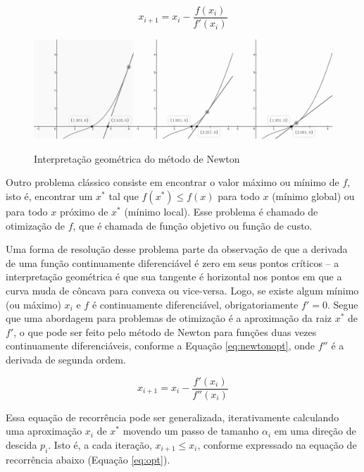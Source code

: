 \documentclass[cic,tc]{iiufrgs}
\begin{document}
\begin{equation}
\label{eq:newton}
x_{i + 1} = x_i - \frac{f(x_i)}{f'(x_i)}
\end{equation}

\begin{figure} \caption{Interpretação geométrica do método de Newton} \begin{center}
\includegraphics[width=0.8\linewidth]{img/tan.png} \end{center}
 \label{fig:tan} \end{figure}

Outro problema clássico consiste em encontrar o valor máximo ou mínimo de $f$,
isto é, encontrar um $x^*$ tal que $f(x^*) \le f(x)$ para todo $x$ (mínimo
global) ou para todo $x$ próximo de $x^*$ (mínimo local). Esse problema é
chamado de otimização de $f$, que é chamada de função objetivo ou função de
custo.

Uma forma de resolução desse problema parte da observação de que a derivada de
uma função continuamente diferenciável é zero em seus pontos críticos -- a
interpretação geométrica é que sua tangente é horizontal nos pontos em que a
curva muda de côncava para convexa ou vice-versa. Logo, se existe algum mínimo
(ou máximo) $x_i$ e $f$ é continuamente diferenciável, obrigatoriamente $f' =
0$. Segue que uma abordagem para problemas de otimização é a aproximação da
raiz $x^*$ de $f'$, o que pode ser feito pelo método de Newton para funções
duas vezes continuamente diferenciáveis, conforme a Equação \ref{eq:newtonopt},
onde $f''$ é a derivada de segunda ordem.

\begin{equation}
\label{eq:newtonopt}
x_{i + 1} = x_i - \frac{f'(x_i)}{f''(x_i)}
\end{equation}

Essa equação de recorrência pode ser generalizada, iterativamente calculando
uma aproximação $x_i$ de $x^*$ movendo um passo de tamanho $\alpha_i$ em uma
direção de descida $p_i$. Isto é, a cada iteração, $x_{i+1} \le x_i$, conforme
expressado na equação de recorrência abaixo (Equação \ref{eq:opt}).
\end{document}
